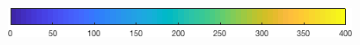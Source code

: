 \documentclass{article}
\begin{document}
\begin{figure}[htp]
\begin{subfigure}{.33\textwidth}
 \label{fig:nutrients2}
\end{subfigure}
\\[+0.2cm]
\begin{subfigure}{.5\textwidth}
 \includegraphics[width=0.95\linewidth]{../Separate_figures/ECOGEM/ocn_O2_profile_clrbr.png}
\end{subfigure}
\end{figure}
\end{document}
